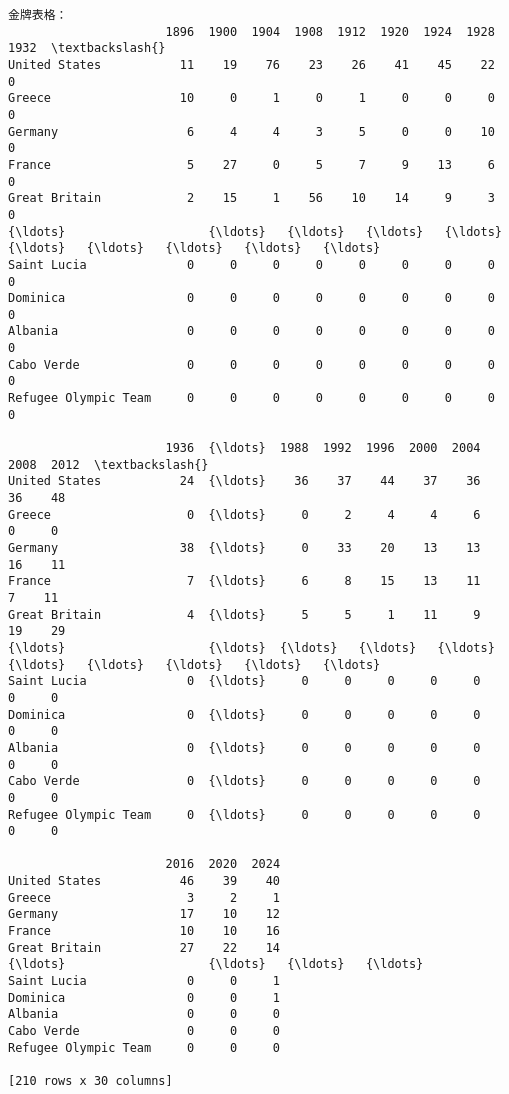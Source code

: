 \documentclass[11pt]{article}
\begin{document}
    \begin{Verbatim}[commandchars=\\\{\}]
金牌表格：
                      1896  1900  1904  1908  1912  1920  1924  1928  1932  \textbackslash{}
United States           11    19    76    23    26    41    45    22     0
Greece                  10     0     1     0     1     0     0     0     0
Germany                  6     4     4     3     5     0     0    10     0
France                   5    27     0     5     7     9    13     6     0
Great Britain            2    15     1    56    10    14     9     3     0
{\ldots}                    {\ldots}   {\ldots}   {\ldots}   {\ldots}   {\ldots}   {\ldots}   {\ldots}   {\ldots}   {\ldots}
Saint Lucia              0     0     0     0     0     0     0     0     0
Dominica                 0     0     0     0     0     0     0     0     0
Albania                  0     0     0     0     0     0     0     0     0
Cabo Verde               0     0     0     0     0     0     0     0     0
Refugee Olympic Team     0     0     0     0     0     0     0     0     0

                      1936  {\ldots}  1988  1992  1996  2000  2004  2008  2012  \textbackslash{}
United States           24  {\ldots}    36    37    44    37    36    36    48
Greece                   0  {\ldots}     0     2     4     4     6     0     0
Germany                 38  {\ldots}     0    33    20    13    13    16    11
France                   7  {\ldots}     6     8    15    13    11     7    11
Great Britain            4  {\ldots}     5     5     1    11     9    19    29
{\ldots}                    {\ldots}  {\ldots}   {\ldots}   {\ldots}   {\ldots}   {\ldots}   {\ldots}   {\ldots}   {\ldots}
Saint Lucia              0  {\ldots}     0     0     0     0     0     0     0
Dominica                 0  {\ldots}     0     0     0     0     0     0     0
Albania                  0  {\ldots}     0     0     0     0     0     0     0
Cabo Verde               0  {\ldots}     0     0     0     0     0     0     0
Refugee Olympic Team     0  {\ldots}     0     0     0     0     0     0     0

                      2016  2020  2024
United States           46    39    40
Greece                   3     2     1
Germany                 17    10    12
France                  10    10    16
Great Britain           27    22    14
{\ldots}                    {\ldots}   {\ldots}   {\ldots}
Saint Lucia              0     0     1
Dominica                 0     0     1
Albania                  0     0     0
Cabo Verde               0     0     0
Refugee Olympic Team     0     0     0

[210 rows x 30 columns]
    \end{Verbatim}
\end{document}
